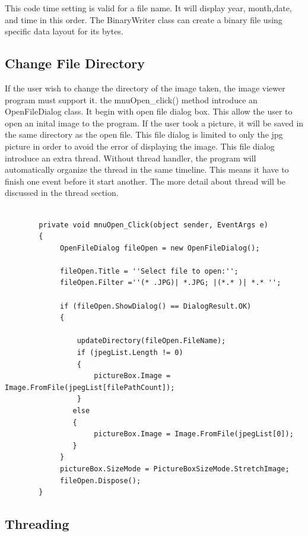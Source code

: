             This code time setting is valid for a file name. It will display year, month,date, and time in this order. The BinaryWriter class can create a binary file using specific data layout for its bytes. 

\subsection{Change File Directory}
If the user wish to change the directory of the image taken, the image viewer program must support it. the mnuOpen\_click() method introduce an OpenFileDialog class. It begin with open file dialog box. This allow the user to open an inital image to the program. If the user took a picture, it will be saved in the same directory as the open file. This file dialog is limited to only the jpg picture in order to avoid the error of displaying the image. 
This file dialog introduce an extra thread. Without thread handler, the program will automatically organize the thread in the same timeline. This means it have to finish one event before it start another. The more detail about thread will be discussed in the thread section. 
\begin{lstlisting}[caption={change file directory},label=lst:changeFD]

        private void mnuOpen_Click(object sender, EventArgs e)        
        {        
             OpenFileDialog fileOpen = new OpenFileDialog();      
            
             fileOpen.Title = ''Select file to open:'';   
             fileOpen.Filter =''(* .JPG)| *.JPG; |(*.* )| *.* '';           

             if (fileOpen.ShowDialog() == DialogResult.OK)    
             {
    
                 updateDirectory(fileOpen.FileName);     
                 if (jpegList.Length != 0)     
                 {                    
                     pictureBox.Image = Image.FromFile(jpegList[filePathCount]);       
                 }         
                else       
                {       
                     pictureBox.Image = Image.FromFile(jpegList[0]);        
                }        
             }        
             pictureBox.SizeMode = PictureBoxSizeMode.StretchImage;       
             fileOpen.Dispose();        
        }       
        \end{lstlisting}
\subsection{Threading}

